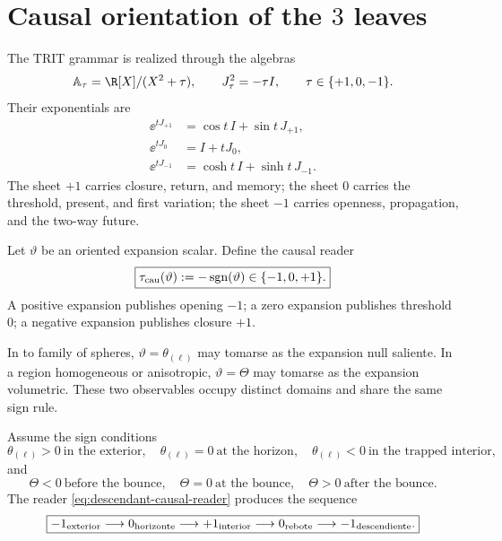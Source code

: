 \section{Causal orientation of the \(3\) leaves}

The TRIT grammar is realized through the algebras
\begin{equation}
 \mathbb A_\tau=\R[X]/(X^2+\tau),
 \qquad
 J_\tau^2=-\tau I,
 \qquad
 \tau\in\{+1,0,-1\}.
 \label{eq:descendant-TRIT-algebras}
\end{equation}
Their exponentials are
\begin{align}
 \ee^{tJ_{+1}}&=\cos t\,I+\sin t\,J_{+1},
 \label{eq:descendant-elliptic}\\
 \ee^{tJ_0}&=I+tJ_0,
 \label{eq:descendant-parabolic}\\
 \ee^{tJ_{-1}}&=\cosh t\,I+\sinh t\,J_{-1}.
 \label{eq:descendant-hyperbolic}
\end{align}
The sheet \(+1\) carries closure, return, and memory; the sheet \(0\) carries the threshold,
present, and first variation; the sheet \(-1\) carries openness, propagation, and
the two-way future.

Let \(\vartheta\) be an oriented expansion scalar. Define the
causal reader
\begin{equation}
 \boxed{
 \tau_{\rm cau}(\vartheta):=-\operatorname{sgn}(\vartheta)
 \in\{-1,0,+1\}.}
 \label{eq:descendant-causal-reader}
\end{equation}
A positive expansion publishes opening \(-1\); a zero expansion
publishes threshold \(0\); a negative expansion publishes closure \(+1\).

In to family of spheres, \(\vartheta=\theta_{(\ell)}\) may tomarse as
the expansion null saliente. In a region homogeneous or anisotropic,
\(\vartheta=\Theta\) may tomarse as the expansion volumetric. These
two observables occupy distinct domains and share the same
sign rule.

\begin{proposition}
\label{prop:descendant-double-threshold}
Assume the sign conditions
\begin{equation}
 \theta_{(\ell)}>0\ \text{in the exterior},
 \quad
 \theta_{(\ell)}=0\ \text{at the horizon},
 \quad
 \theta_{(\ell)}<0\ \text{in the trapped interior},
 \label{eq:descendant-null-signs}
\end{equation}
and
\begin{equation}
 \Theta<0\ \text{before the bounce},
 \quad
 \Theta=0\ \text{at the bounce},
 \quad
 \Theta>0\ \text{after the bounce}.
 \label{eq:descendant-volume-signs}
\end{equation}
The reader \cref{eq:descendant-causal-reader} produces the sequence
\begin{equation}
 \boxed{
 -1_{\rm exterior}
 \longrightarrow0_{\rm horizonte}
 \longrightarrow+1_{\rm interior}
 \longrightarrow0_{\rm rebote}
 \longrightarrow-1_{\rm descendiente}.}
 \label{eq:descendant-five-stage-sequence}
\end{equation}
\end{proposition}

